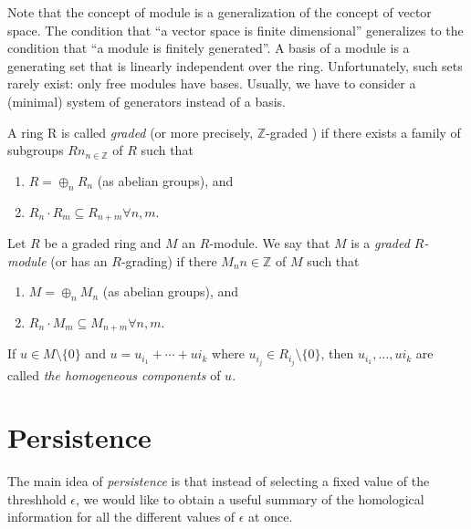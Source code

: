 \documentclass[11pt,reqno,oneside,a4paper]{article}
\begin{document}
Note that the concept of module is a generalization of the concept of vector space. The condition that ``a vector space is finite dimensional” generalizes to the condition that ``a module is finitely generated”. A basis of a module is a generating set that is linearly independent over the ring. Unfortunately, such sets rarely exist: only free modules have bases. Usually, we have to consider a (minimal) system of generators instead of a basis.

\begin{defn}
 A ring R is called \textit{graded} (or more precisely, $\mathbb{Z}$-graded ) if there exists a	family of subgroups ${Rn}_{n\in \mathbb{Z}}$ of $R$ such that
 \begin{enumerate}
 	\item $R = \oplus_n R_n$ (as abelian groups), and
 	\item $R_n \cdot R_m \subseteq R_{n+m} \forall n, m.$
 \end{enumerate}
\end{defn}

\begin{defn}
	Let $R$ be a graded ring and $M$ an $R$-module. We say that $M$ is a\textit{ graded
	$R$-module} (or has an $R$-grading) if there ${M_n}{n\in \mathbb{Z}} $ of $M$ such	that

\begin{enumerate}
	\item $M = \oplus_n M_n$ (as abelian groups), and
	\item $R_n \cdot M_m \subseteq M_{n+m} \forall n, m.$
\end{enumerate}

	If $u \in M \setminus \{0\}$ and $u = u_{i_1} + \cdots + u{i_k} $ where $u_{i_j}\in R_{i_j}\setminus \{0\}$, then $u_{i_1}	, \dots, u{i_k}$ 
	are called\textit{ the homogeneous components } of $u$. 
\end{defn}

\section{Persistence}

The main idea of \textit{persistence} is that instead of selecting a fixed value of the threshhold $\epsilon$, we would like to obtain a useful summary of the homological information for all the different values of $\epsilon$ at once. 
\end{document}
